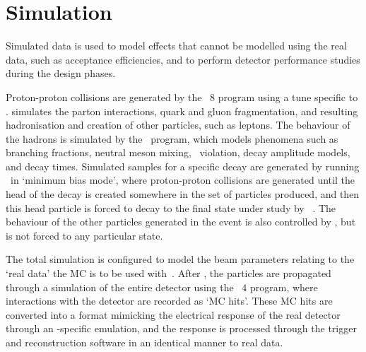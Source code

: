 \section{Simulation}
\label{chap:intro:lhcb:simulation}

Simulated data is used to model effects that cannot be modelled using the real 
data, such as acceptance efficiencies, and to perform detector performance 
studies during the design phases.

Proton-proton collisions are generated by the \pythia\ 8 program using a tune 
specific to \lhcb.
\pythia simulates the parton interactions, quark and gluon fragmentation, and 
resulting hadronisation and creation of other particles, such as leptons.
The behaviour of the hadrons is simulated by the \evtgen\ program, which models 
phenomena such as branching fractions, neutral meson mixing, \CP\ violation, 
decay amplitude models, and decay times.
Simulated samples for a specific decay are generated by running \pythia\ in 
`minimum bias mode', where proton-proton collisions are generated until the 
head of the decay is created somewhere in the set of particles produced, and 
then this head particle is forced to decay to the final state under study by 
\evtgen~\cite{Clemencic:2011zza}.
The behaviour of the other particles generated in the event is also controlled 
by \evtgen, but is not forced to any particular state.

The total simulation is configured to model the beam parameters relating to the 
`real data' the \ac{MC} is to be used with~\cite{Belyaev:1322400}.
After \evtgen, the particles are propagated through a simulation of the entire 
detector using the \geant\ 4 program, where interactions with the detector are 
recorded as `\ac{MC} hits'.
These \ac{MC} hits are converted into a format mimicking the electrical 
response of the real detector through an \lhcb-specific emulation, and the 
response is processed through the trigger and reconstruction software in an 
identical manner to real data.

